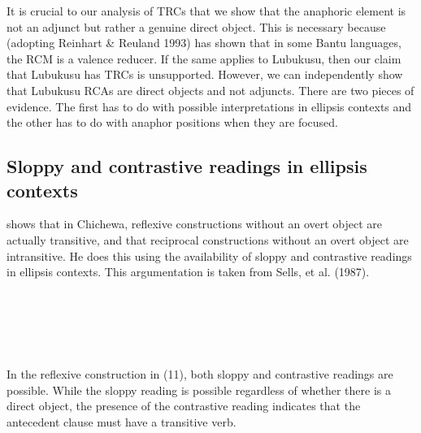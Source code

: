   It is crucial to our analysis of TRCs that we show that the anaphoric element is not an adjunct but rather a genuine direct object. This is necessary because \citet{Mchombo1994} (adopting Reinhart \& Reuland 1993) has shown that in some Bantu languages, the RCM is a valence reducer. If the same applies to Lubukusu, then our claim that Lubukusu has TRCs is unsupported. However, we can independently show that Lubukusu RCAs are direct objects and not adjuncts. There are two pieces of evidence. The first has to do with possible interpretations in ellipsis contexts and the other has to do with anaphor positions when they are focused.

\subsection{Sloppy and contrastive readings in ellipsis contexts}

  \citet[106]{Mchombo2004} shows that in Chichewa, reflexive constructions without an overt object are actually transitive, and that reciprocal constructions without an overt object are intransitive. He does this using the availability of sloppy and contrastive readings in ellipsis contexts. This argumentation is taken from Sells, et al. (1987).

\setcounter{listWWviiiNumxlileveli}{0}
\begin{listWWviiiNumxlileveli}
\item \ea\label{ex:}
\\
\ea\label{ex:}
\\
\ea\label{ex:}
\\
\ea\label{ex:}
\\
\end{listWWviiiNumxlileveli}

In the reflexive construction in (11), both sloppy and contrastive readings are possible. While the sloppy reading is possible regardless of whether there is a direct object, the presence of the contrastive reading indicates that the antecedent clause must have a transitive verb. 

